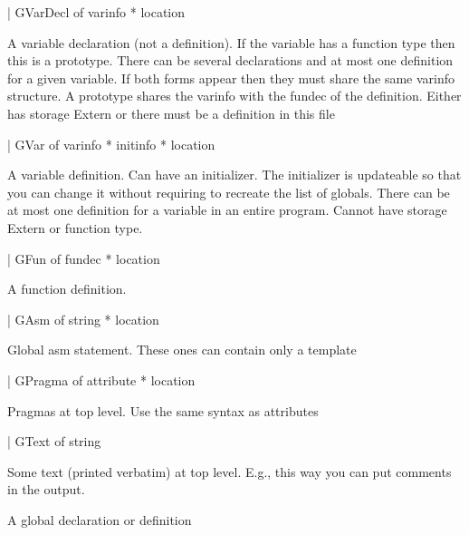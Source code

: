 \documentclass[11pt]{article}
\begin{document}
\begin{ocamldoccode}
  | GVarDecl of varinfo * location
\end{ocamldoccode}
\begin{ocamldoccomment}
A variable declaration (not a definition). If the variable has a 
       function type then this is a prototype. There can be several 
       declarations and at most one definition for a given variable. If both 
       forms appear then they must share the same varinfo structure. A 
       prototype shares the varinfo with the fundec of the definition. Either 
       has storage Extern or there must be a definition in this file
\end{ocamldoccomment}
\begin{ocamldoccode}
  | GVar of varinfo * initinfo * location
\end{ocamldoccode}
\begin{ocamldoccomment}
A variable definition. Can have an initializer. The initializer is 
 updateable so that you can change it without requiring to recreate 
 the list of globals. There can be at most one definition for a 
 variable in an entire program. Cannot have storage Extern or function 
 type.
\end{ocamldoccomment}
\begin{ocamldoccode}
  | GFun of fundec * location
\end{ocamldoccode}
\begin{ocamldoccomment}
A function definition.
\end{ocamldoccomment}
\begin{ocamldoccode}
  | GAsm of string * location
\end{ocamldoccode}
\begin{ocamldoccomment}
Global asm statement. These ones 
                                            can contain only a template
\end{ocamldoccomment}
\begin{ocamldoccode}
  | GPragma of attribute * location
\end{ocamldoccode}
\begin{ocamldoccomment}
Pragmas at top level. Use the same 
                                            syntax as attributes
\end{ocamldoccomment}
\begin{ocamldoccode}
  | GText of string
\end{ocamldoccode}
\begin{ocamldoccomment}
Some text (printed verbatim) at 
                                            top level. E.g., this way you can 
                                            put comments in the output.
\end{ocamldoccomment}
\begin{ocamldocdescription}
A global declaration or definition


\end{ocamldocdescription}
\end{document}
